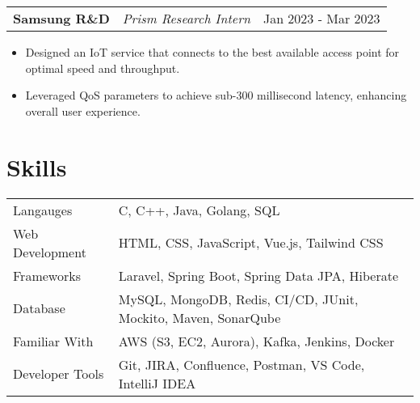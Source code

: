 \documentclass[a4paper,10pt]{article}
\makeatletter
\newenvironment{joblong}[3]
    {
    \begin{tabularx}{\linewidth}{@{}l X r@{}}
    \textbf{#1} & \textit{#2} &  #3 \\[3pt]
    \end{tabularx}
    \begin{minipage}[t]{\linewidth}
    \begin{itemize}[nosep,after=\strut, leftmargin=1em, itemsep=2pt,label=--]
    }
    {
    \end{itemize}
    \end{minipage}    
    }
\makeatother
\begin{document}


\begin{joblong}{Samsung R\&D}{Prism Research Intern}{Jan 2023 - Mar 2023}
    \item Designed an IoT service that connects to the best available access point for optimal speed and throughput.
    \item Leveraged QoS parameters to achieve sub-300 millisecond latency, enhancing overall user experience.
\end{joblong}
\vspace{-5pt}

\section{Skills}
\vspace{-4pt}
\begin{tabularx}{\linewidth}{@{}l X@{}}
Langauges &  \normalsize{C, C++, Java, Golang, SQL}\\
Web Development & \normalsize{HTML, CSS, JavaScript, Vue.js, Tailwind CSS}\\
Frameworks &  \normalsize{Laravel, Spring Boot, Spring Data JPA, Hiberate}\\
Database & \normalsize{MySQL, MongoDB, Redis, CI/CD, JUnit, Mockito, Maven, SonarQube}\\
Familiar With & \normalsize{AWS (S3, EC2, Aurora), Kafka, Jenkins, Docker}\\
Developer Tools & \normalsize{Git, JIRA, Confluence, Postman, VS Code, IntelliJ IDEA}\\
\end{tabularx}
\end{document}
